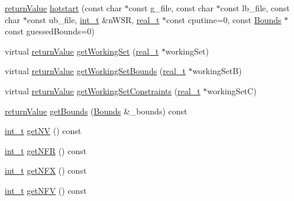 \begin{DoxyCompactItemize}
\item 
\hyperlink{_message_handling_8hpp_a81d556f613bfbabd0b1f9488c0fa865e}{return\+Value} \hyperlink{class_q_problem_b_ac9305bb855858f9f6e1ff7c15ff39204}{hotstart} (const char $\ast$const g\+\_\+file, const char $\ast$const lb\+\_\+file, const char $\ast$const ub\+\_\+file, \hyperlink{_types_8hpp_ab6fd6105e64ed14a0c9281326f05e623}{int\+\_\+t} \&n\+W\+SR, \hyperlink{qp_o_a_s_e_s__wrapper_8h_a0d00e2b3dfadee81331bbb39068570c4}{real\+\_\+t} $\ast$const cputime=0, const \hyperlink{class_bounds}{Bounds} $\ast$const guessed\+Bounds=0)
\item 
virtual \hyperlink{_message_handling_8hpp_a81d556f613bfbabd0b1f9488c0fa865e}{return\+Value} \hyperlink{class_q_problem_b_a29c4cdd661701580f1ebe1e78804bd43}{get\+Working\+Set} (\hyperlink{qp_o_a_s_e_s__wrapper_8h_a0d00e2b3dfadee81331bbb39068570c4}{real\+\_\+t} $\ast$working\+Set)
\item 
virtual \hyperlink{_message_handling_8hpp_a81d556f613bfbabd0b1f9488c0fa865e}{return\+Value} \hyperlink{class_q_problem_b_a317183ae1f862863ac5b50e0c4028227}{get\+Working\+Set\+Bounds} (\hyperlink{qp_o_a_s_e_s__wrapper_8h_a0d00e2b3dfadee81331bbb39068570c4}{real\+\_\+t} $\ast$working\+SetB)
\item 
virtual \hyperlink{_message_handling_8hpp_a81d556f613bfbabd0b1f9488c0fa865e}{return\+Value} \hyperlink{class_q_problem_b_aa4b108a056ac2a35bf3938d1ca18f1cc}{get\+Working\+Set\+Constraints} (\hyperlink{qp_o_a_s_e_s__wrapper_8h_a0d00e2b3dfadee81331bbb39068570c4}{real\+\_\+t} $\ast$working\+SetC)
\item 
\hyperlink{_message_handling_8hpp_a81d556f613bfbabd0b1f9488c0fa865e}{return\+Value} \hyperlink{class_q_problem_b_aa401ddfd0bc69a929c5c00040be93f5e}{get\+Bounds} (\hyperlink{class_bounds}{Bounds} \&\+\_\+bounds) const
\item 
\hyperlink{_types_8hpp_ab6fd6105e64ed14a0c9281326f05e623}{int\+\_\+t} \hyperlink{class_q_problem_b_a8bfcd5a9acddbe43a0574f86c6339a33}{get\+NV} () const
\item 
\hyperlink{_types_8hpp_ab6fd6105e64ed14a0c9281326f05e623}{int\+\_\+t} \hyperlink{class_q_problem_b_a9111a3b8cdebcec73cdec7a446c52457}{get\+N\+FR} () const
\item 
\hyperlink{_types_8hpp_ab6fd6105e64ed14a0c9281326f05e623}{int\+\_\+t} \hyperlink{class_q_problem_b_ace4ced063e846e210630f52ae40b32f7}{get\+N\+FX} () const
\item 
\hyperlink{_types_8hpp_ab6fd6105e64ed14a0c9281326f05e623}{int\+\_\+t} \hyperlink{class_q_problem_b_a6ea3aaec6918af07d0db993aa365a71e}{get\+N\+FV} () const

\end{DoxyCompactItemize}
